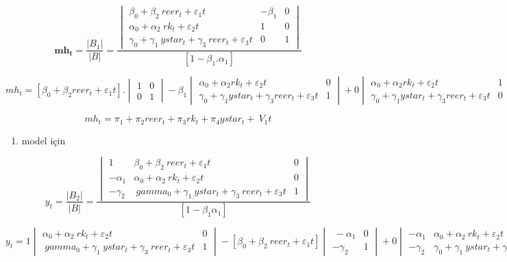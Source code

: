 \documentclass[]{article}
\providecommand{\tightlist}{%
  \setlength{\itemsep}{0pt}\setlength{\parskip}{0pt}}
\begin{document}
\[
\mathbf{mh_t} = \frac{|B_1|}{|B|} = \frac{{\begin{vmatrix} \beta_0 + \beta_2\ reer_t + \varepsilon_1t & -\beta_1 & 0 \\
\alpha_0 + \alpha_2\ rk_t + \varepsilon_2t & 1 & 0 \\
\gamma_ 0 + \gamma_1\ ystar_t + \gamma_3\ reer_t + \varepsilon_3t & 0 & 1
\end{vmatrix}}}{[{1 - \beta_1 . \alpha_1}]}
\]

\[
mh_t = [\beta_0 + \beta_2 reer_t + \varepsilon_1t] . \begin{vmatrix} 1 & 0 \\ 0 & 1 \end{vmatrix} -\beta_1 \begin{vmatrix} \alpha_0 + \alpha_2 rk_t + \varepsilon_2t & 0 \\ \gamma_0 + \gamma_1 ystar_t + \gamma_3 reer_t + \varepsilon_3t & 1 \end{vmatrix} + 0 \begin{vmatrix} \alpha_0 + \alpha_2 rk_t + \varepsilon_2t & 1 \\ \gamma_ 0 + \gamma_1 ystar_t + \gamma_3 reer_t + \varepsilon_3t & 0 \end{vmatrix}
\]

\[
mh_t= \pi_1 + \pi_2 reer_t + \pi_3 rk_t + \pi_4 ystar_t + \ V_1t
\]

\begin{enumerate}
\def\labelenumi{\arabic{enumi}.}
\setcounter{enumi}{1}
\tightlist
\item
  model için
\end{enumerate}

\[
y_t = \frac{|B_2|}{|B|} = \frac{{\begin{vmatrix} 1 & \beta_0 + \beta_2\ reer_t + \varepsilon_1t & 0 \\
-\alpha_1  & \alpha_0 + \alpha_2\ rk_t + \varepsilon_2t & 0 \\
-\gamma_2 & \ gamma_0 + \gamma_1\ ystar_t + \gamma_3\ reer_t + \varepsilon_3t & 1
\end{vmatrix}}}{[{1 - \beta_1 \alpha_1}]}
\]

\[
y_t = 1 \begin{vmatrix} \alpha_0 + \alpha_2\ rk_t + \varepsilon_2t &  0\\
\ gamma_0 + \gamma_1\ ystar_t + \gamma_3\ reer_t + \varepsilon_3t & 1 \end{vmatrix} - [\beta_0 + \beta_2\ reer_t + \varepsilon_1t] \begin{vmatrix} \ -\alpha_1  &  0 \\
 -\gamma_2 & 1 \end{vmatrix} +0 \begin{vmatrix} -\alpha_1 & \alpha_0 + \alpha_2\ rk_t + \varepsilon_2t
\\ -\gamma_2 & \gamma_0 + \gamma_1\ ystar_t + \gamma_3\ reer_t + \varepsilon_3t \end{vmatrix}
\]
\end{document}
